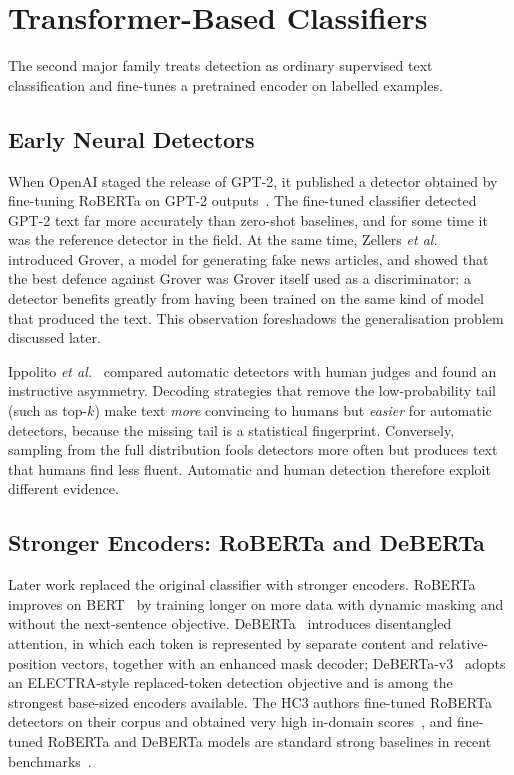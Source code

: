 \section{Transformer-Based Classifiers}

The second major family treats detection as ordinary supervised text
classification and fine-tunes a pretrained encoder on labelled examples.

\subsection{Early Neural Detectors}

When OpenAI staged the release of GPT-2, it published a detector obtained by
fine-tuning RoBERTa on GPT-2 outputs~\cite{solaiman2019release,liu2019roberta}.
The fine-tuned classifier detected GPT-2 text far more accurately than
zero-shot baselines, and for some time it was the reference detector in the
field. At the same time, Zellers \textit{et al.}~\cite{zellers2019grover}
introduced Grover, a model for generating fake news articles, and showed that
the best defence against Grover was Grover itself used as a discriminator: a
detector benefits greatly from having been trained on the same kind of model
that produced the text. This observation foreshadows the generalisation
problem discussed later.

Ippolito \textit{et al.}~\cite{ippolito2020automatic} compared automatic
detectors with human judges and found an instructive asymmetry. Decoding
strategies that remove the low-probability tail (such as top-$k$) make text
\emph{more} convincing to humans but \emph{easier} for automatic detectors,
because the missing tail is a statistical fingerprint. Conversely, sampling
from the full distribution fools detectors more often but produces text that
humans find less fluent. Automatic and human detection therefore exploit
different evidence.

\subsection{Stronger Encoders: RoBERTa and DeBERTa}

Later work replaced the original classifier with stronger encoders.
RoBERTa~\cite{liu2019roberta} improves on BERT~\cite{devlin2019bert} by
training longer on more data with dynamic masking and without the
next-sentence objective. DeBERTa~\cite{he2021deberta} introduces disentangled
attention, in which each token is represented by separate content and
relative-position vectors, together with an enhanced mask decoder;
DeBERTa-v3~\cite{he2023debertav3} adopts an ELECTRA-style replaced-token
detection objective and is among the strongest base-sized encoders available.
The HC3 authors fine-tuned RoBERTa detectors on their corpus and obtained
very high in-domain scores~\cite{guo2023hc3}, and fine-tuned RoBERTa and
DeBERTa models are standard strong baselines in recent benchmarks~\cite{wang2024m4,
li2024mage,dugan2024raid}.

